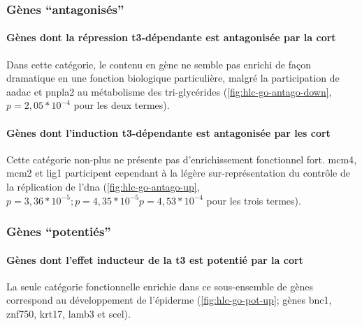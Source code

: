 \documentclass[../main.tex]{subfiles}
\begin{document}

		\subsubsection{Gènes ``antagonisés''}

			\paragraph{Gènes dont la répression \gls{t3}-dépendante est antagonisée par la \gls{cort}}
				Dans cette catégorie, le contenu en gène ne semble pas enrichi de façon dramatique en une fonction biologique particulière, malgré la participation de \gls{aadac} et \gls{pnpla2} au métabolisme des tri-glycérides (\autoref{fig:hlc-go-antago-down}, $\textit{p} = 2,05 * 10^{-4}$ pour les deux termes).

				

			\paragraph{Gènes dont l'induction \gls{t3}-dépendante est antagonisée par les \gls{cort}}
				Cette catégorie non-plus ne présente pas d'enrichissement fonctionnel fort.
				\gls{mcm4}, \gls{mcm2} et \gls{lig1} participent cependant à la légère sur-représentation du contrôle de la réplication de l'\gls{dna} (\autoref{fig:hlc-go-antago-up}, $\textit{p}=3,36*10^{-5}; \textit{p}=4,35*10^{-5}\textit{p}=4,53*10^{-4}$ pour les trois termes).

				


		\subsubsection{Gènes ``potentiés''}

			\paragraph{Gènes dont l'effet inducteur de la \gls{t3} est potentié par la \gls{cort}}
				La seule catégorie fonctionnelle enrichie dans ce sous-ensemble de gènes correspond au développement de l'épiderme (\autoref{fig:hlc-go-pot-up}; gènes \gls{bnc1}, \gls{znf750}, \gls{krt17}, \gls{lamb3} et \gls{scel}).
\end{document}
